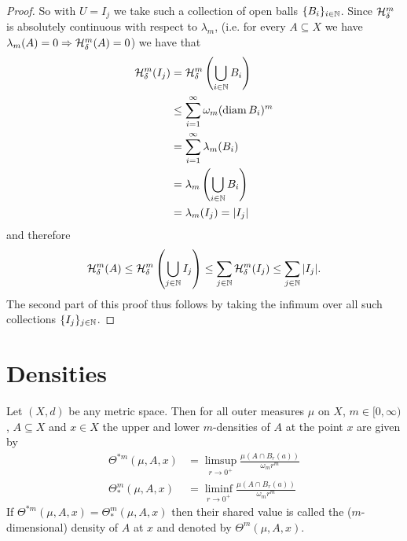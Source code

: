 \begin{proof}
So with $U = I_j$ we take such a collection of open balls $\{B_i\}_{i \in \mathbb{N}}$. Since $\mathcal{H}_{\delta}^m$ is absolutely continuous with respect to $\lambda_m$, (i.e. for every $A \subseteq X$ we have $\lambda_m(A) =0 \Rightarrow \mathcal{H}_{\delta}^m(A)=0$) we have that
\begin{align*}
    \mathcal{H}_{\delta}^m(I_j) &= \mathcal{H}_{\delta}^m\left(\bigcup_{i\in \mathbb{N}} B_i\right) \\
    &\le \sum_{i=1}^{\infty} \omega_m(\operatorname{diam} B_i)^m \\
    &= \sum_{i=1}^{\infty} \lambda_m(B_i) \\
    &= \lambda_m\left(\bigcup_{i\in \mathbb{N}} B_i\right) \\
    &= \lambda_m(I_j)=|I_j|
\end{align*}
and therefore
\[
    \mathcal{H}_{\delta}^m(A) \le \mathcal{H}_{\delta}^m\left(\bigcup_{j \in \mathbb{N}}I_j\right) \le \sum_{j \in \mathbb{N}} \mathcal{H}_{\delta}^m(I_j) \le \sum_{j \in \mathbb{N}}|I_j|.
\]
The second part of this proof thus follows by taking the infimum over all such collections $\{I_j\}_{j \in \mathbb{N}}$.
\end{proof}

\section{Densities}

\begin{definition}
Let $(X,d)$ be any metric space. Then for all outer measures $\mu$ on $X$, $m \in [0, \infty)$, $A \subseteq X$ and $x \in X$ the upper and lower $m$-densities of $A$ at the point $x$ are given by
\begin{align*}
	\Theta^{*m}(\mu,A,x) &= \limsup_{r \to 0^{+}} \frac{\mu (A \cap B_r(a)) }{\omega_{m}r^{m}} \\
	\Theta_{*}^{m}(\mu,A,x) &= \liminf_{r \to 0^{+}} \frac{\mu (A \cap B_r(a)) }{\omega_{m}r^{m}}
\end{align*}
If $\Theta^{*m}(\mu,A,x)=\Theta_{*}^{m}(\mu,A,x)$ then their shared value is called the ($m$-dimensional) density of $A$ at $x$ and denoted by $\Theta^{m}(\mu,A,x)$.
\end{definition}


